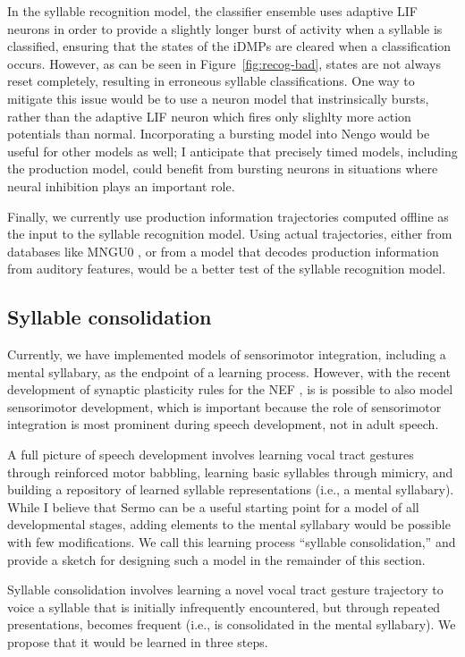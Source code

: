 In the syllable recognition model,
the classifier ensemble uses adaptive LIF neurons
in order to provide a slightly longer
burst of activity when a syllable is classified,
ensuring that the states
of the iDMPs are cleared
when a classification occurs.
However, as can be seen in Figure~\ref{fig:recog-bad},
states are not always reset completely,
resulting in erroneous syllable classifications.
One way to mitigate this issue
would be to use a neuron model
that instrinsically bursts,
rather than the adaptive LIF neuron
which fires only slighlty more
action potentials than normal.
Incorporating a bursting model
into Nengo would be useful for other models as well;
I anticipate that precisely timed models,
including the production model,
could benefit from bursting neurons
in situations where neural inhibition
plays an important role.

Finally, we currently use
production information trajectories
computed offline as the input to
the syllable recognition model.
Using actual trajectories,
either from databases like
MNGU0 \citep{steiner2012},
or from a model that decodes
production information from
auditory features,
would be a better test
of the syllable recognition model.

\subsection{Syllable consolidation}

Currently, we have implemented models
of sensorimotor integration,
including a mental syllabary,
as the endpoint of a learning process.
However, with the recent development
of synaptic plasticity rules
for the NEF
\citep{macneil2011,bekolay2013a},
is is possible to also model
sensorimotor development,
which is important because
the role of sensorimotor integration
is most prominent during speech development,
not in adult speech.

A full picture of speech development involves
learning vocal tract gestures
through reinforced motor babbling,
learning basic syllables
through mimicry,
and building a repository of
learned syllable representations
(i.e., a mental syllabary).
While I believe that Sermo can be
a useful starting point for a
model of all developmental stages,
adding elements to the mental syllabary
would be possible with few modifications.
We call this learning process
``syllable consolidation,''
and provide a sketch for designing
such a model in the remainder of this section.

Syllable consolidation involves
learning a novel vocal tract gesture trajectory
to voice a syllable that
is initially infrequently encountered,
but through repeated presentations,
becomes frequent
(i.e., is consolidated in the mental syllabary).
We propose that it would be learned
in three steps.

